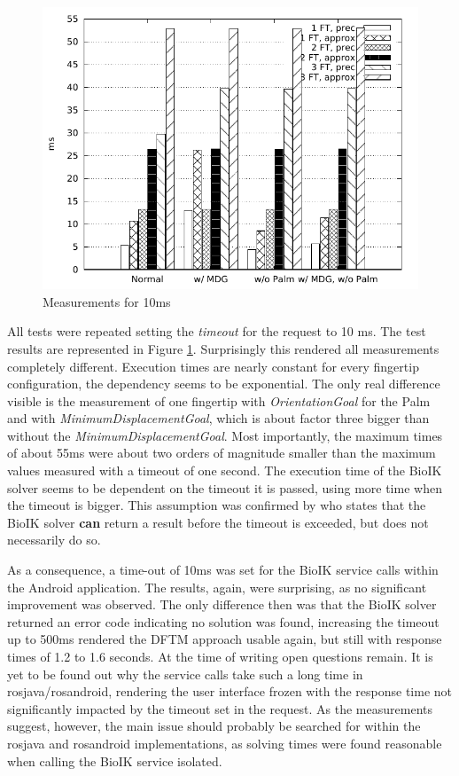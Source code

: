 \begin{figure}
	\caption{\label{fig:eval:10ms}Measurements for 10ms}
	\begin{center}
		\includegraphics{assets/chpt_eval/10ms.pdf}
	\end{center}
\end{figure}

All tests were repeated setting the \textit{timeout} for the request to 10 ms. The test results are represented in Figure \ref{fig:eval:10ms}. Surprisingly this rendered all measurements completely different. Execution times are nearly constant for every fingertip configuration, the dependency seems to be exponential. The only real difference visible is the measurement of one fingertip with \textit{OrientationGoal} for the Palm and with \textit{MinimumDisplacementGoal}, which is about factor three bigger than without the \textit{MinimumDisplacementGoal}. Most importantly, the maximum times of about 55ms were about two orders of magnitude smaller than the maximum values measured with a timeout of one second. The execution time of the BioIK solver seems to be dependent on the timeout it is passed, using more time when the timeout is bigger. This assumption was confirmed by \citeauthor{Ruppel17}\cite{Ruppel17} who states that the BioIK solver \textbf{can} return a result before the timeout is exceeded, but does not necessarily do so.

As a consequence, a time-out of 10ms was set for the BioIK service calls within the Android application. The results, again, were surprising, as no significant improvement was observed. The only difference then was that the BioIK solver returned an error code indicating no solution was found, increasing the timeout up to 500ms rendered the DFTM approach usable again, but still with response times of 1.2 to 1.6 seconds. At the time of writing open questions remain. It is yet to be found out why the service calls take such a long time in rosjava/rosandroid, rendering the user interface frozen with the response time not significantly impacted by the timeout set in the request. As the measurements suggest, however, the main issue should probably be searched for within the rosjava and rosandroid implementations, as solving times were found reasonable when calling the BioIK service isolated.

